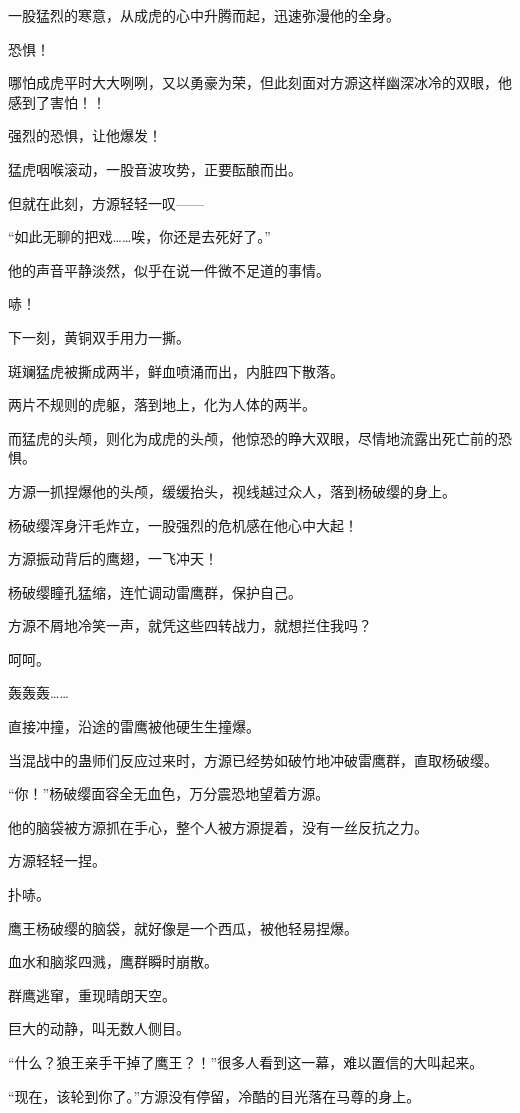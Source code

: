 \begin{this_body}
一股猛烈的寒意，从成虎的心中升腾而起，迅速弥漫他的全身。

恐惧！

哪怕成虎平时大大咧咧，又以勇豪为荣，但此刻面对方源这样幽深冰冷的双眼，他感到了害怕！！

强烈的恐惧，让他爆发！

猛虎咽喉滚动，一股音波攻势，正要酝酿而出。

但就在此刻，方源轻轻一叹——

“如此无聊的把戏……唉，你还是去死好了。”

他的声音平静淡然，似乎在说一件微不足道的事情。

哧！

下一刻，黄铜双手用力一撕。

斑斓猛虎被撕成两半，鲜血喷涌而出，内脏四下散落。

两片不规则的虎躯，落到地上，化为人体的两半。

而猛虎的头颅，则化为成虎的头颅，他惊恐的睁大双眼，尽情地流露出死亡前的恐惧。

方源一抓捏爆他的头颅，缓缓抬头，视线越过众人，落到杨破缨的身上。

杨破缨浑身汗毛炸立，一股强烈的危机感在他心中大起！

方源振动背后的鹰翅，一飞冲天！

杨破缨瞳孔猛缩，连忙调动雷鹰群，保护自己。

方源不屑地冷笑一声，就凭这些四转战力，就想拦住我吗？

呵呵。

轰轰轰……

直接冲撞，沿途的雷鹰被他硬生生撞爆。

当混战中的蛊师们反应过来时，方源已经势如破竹地冲破雷鹰群，直取杨破缨。

“你！”杨破缨面容全无血色，万分震恐地望着方源。

他的脑袋被方源抓在手心，整个人被方源提着，没有一丝反抗之力。

方源轻轻一捏。

扑哧。

鹰王杨破缨的脑袋，就好像是一个西瓜，被他轻易捏爆。

血水和脑浆四溅，鹰群瞬时崩散。

群鹰逃窜，重现晴朗天空。

巨大的动静，叫无数人侧目。

“什么？狼王亲手干掉了鹰王？！”很多人看到这一幕，难以置信的大叫起来。

“现在，该轮到你了。”方源没有停留，冷酷的目光落在马尊的身上。


\end{this_body}
